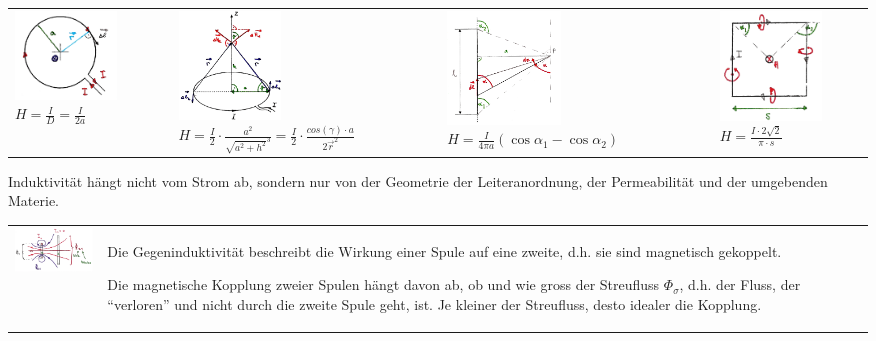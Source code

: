 \renewcommand{\arraystretch}{1}

\begin{tabular}{llll}
	\parbox{4cm}{
		\includegraphics[width=2.7cm]{./bilder/biot1.png} \\
		$H =\frac{I}{D} = \frac{I}{2a}$}
	& \parbox{5cm}{
		\includegraphics[width=2.7cm]{./bilder/biot2.png} \\
		$H=\frac{I}{2} \cdot \frac{a^2}{\sqrt{a^2+h^2}^3} = \frac{I}{2} \cdot 
			\frac{cos(\gamma)\cdot a}{2\vec{r}^2}$}
	& \parbox{4.5cm}{
		\includegraphics[width=3cm]{./bilder/biot3.png} \\
		$H=\frac{I}{4\pi a}(\cos \alpha_1- \cos \alpha_2)$}
	& \parbox{4.5cm}{
		\includegraphics[width=2.7cm]{./bilder/biot4.png} \\
		$H= \frac{I \cdot 2 \sqrt{2}}{\pi \cdot s}$ }
\end{tabular}

Induktivität hängt nicht vom Strom ab, sondern nur von der Geometrie der
Leiteranordnung, der Permeabilität und der umgebenden Materie.

\begin{tabular}{ll}
\parbox{4.5cm}{
\includegraphics[width=4cm]{./bilder/gegeninduktivitaet.png}
}
& \parbox{14.5cm}{Die Gegeninduktivität beschreibt die Wirkung einer Spule auf
eine zweite, d.h. sie sind magnetisch gekoppelt.

Die magnetische Kopplung zweier Spulen hängt davon ab, ob und wie
gross der
Streufluss $\Phi_{\sigma}$, d.h. der Fluss, der ``verloren'' und nicht durch
die zweite Spule geht, ist. Je kleiner der Streufluss, desto idealer die
Kopplung.}
\end{tabular}

